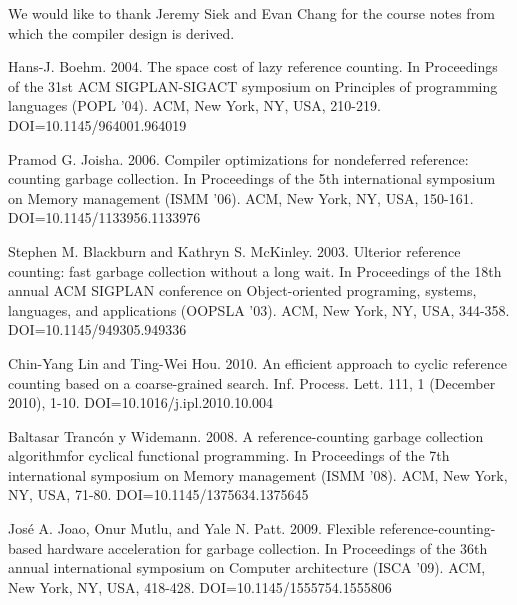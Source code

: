 \documentclass{sigplanconf}
\begin{document}

\acks

We would like to thank Jeremy Siek and Evan Chang for the course notes from which the compiler design is derived.





\begin{thebibliography}{}
\softraggedright

Hans-J. Boehm. 2004. The space cost of lazy reference counting. In Proceedings of the 31st ACM SIGPLAN-SIGACT symposium on Principles of programming languages (POPL '04). ACM, New York, NY, USA, 210-219. DOI=10.1145/964001.964019 

Pramod G. Joisha. 2006. Compiler optimizations for nondeferred reference: counting garbage collection. In Proceedings of the 5th international symposium on Memory management (ISMM '06). ACM, New York, NY, USA, 150-161. DOI=10.1145/1133956.1133976

Stephen M. Blackburn and Kathryn S. McKinley. 2003. Ulterior reference counting: fast garbage collection without a long wait. In Proceedings of the 18th annual ACM SIGPLAN conference on Object-oriented programing, systems, languages, and applications (OOPSLA '03). ACM, New York, NY, USA, 344-358. DOI=10.1145/949305.949336

Chin-Yang Lin and Ting-Wei Hou. 2010. An efficient approach to cyclic reference counting based on a coarse-grained search. Inf. Process. Lett. 111, 1 (December 2010), 1-10. DOI=10.1016/j.ipl.2010.10.004 

Baltasar Trancón y Widemann. 2008. A reference-counting garbage collection algorithmfor cyclical functional programming. In Proceedings of the 7th international symposium on Memory management (ISMM '08). ACM, New York, NY, USA, 71-80. DOI=10.1145/1375634.1375645 

José A. Joao, Onur Mutlu, and Yale N. Patt. 2009. Flexible reference-counting-based hardware acceleration for garbage collection. In Proceedings of the 36th annual international symposium on Computer architecture (ISCA '09). ACM, New York, NY, USA, 418-428. DOI=10.1145/1555754.1555806


\end{thebibliography}
\end{document}
